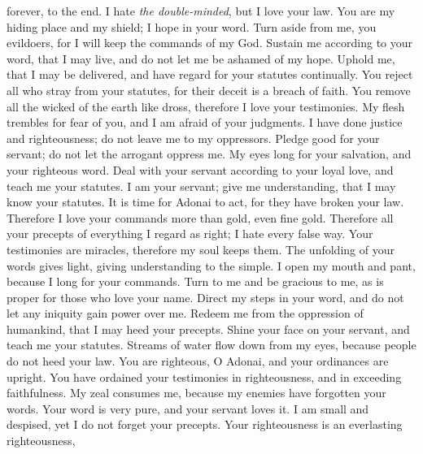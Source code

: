 \begin{biblechapter}
forever, to the end.
 I hate \textit{the double-minded}, 
but I love your law.
\verse You are my hiding place and my shield; 
I hope in your word.
\verse Turn aside from me, you evildoers, 
for I will keep the commands of my God.
\verse Sustain me according to your word, that I may live, 
and do not let me be ashamed of my hope.
\verse Uphold me, that I may be delivered, 
and have regard for your statutes continually.
\verse You reject all who stray from your statutes, 
for their deceit is a breach of faith.
\verse You remove all the wicked of the earth like dross, 
therefore I love your testimonies.
\verse My flesh trembles for fear of you, 
and I am afraid of your judgments.
 I have done justice and righteousness; 
do not leave me to my oppressors.
\verse Pledge good for your servant; 
do not let the arrogant oppress me.
\verse My eyes long for your salvation, 
and your righteous word.
\verse Deal with your servant according to your loyal love, 
and teach me your statutes.
\verse I am your servant; give me understanding, 
that I may know your statutes.
\verse It is time for Adonai to act, 
for they have broken your law.
\verse Therefore I love your commands 
more than gold, even fine gold.
\verse Therefore all your precepts of everything I regard as right; 
I hate every false way.
 Your testimonies are miracles, 
therefore my soul keeps them.
\verse The unfolding of your words gives light, 
giving understanding to the simple.
\verse I open my mouth and pant, 
because I long for your commands.
\verse Turn to me and be gracious to me, 
as is proper for those who love your name.
\verse Direct my steps in your word, 
and do not let any iniquity gain power over me.
\verse Redeem me from the oppression of humankind, 
that I may heed your precepts.
\verse Shine your face on your servant, 
and teach me your statutes.
\verse Streams of water flow down from my eyes, 
because people do not heed your law.
 You are righteous, O Adonai, 
and your ordinances are upright.
\verse You have ordained your testimonies in righteousness, 
and in exceeding faithfulness.
\verse My zeal consumes me, 
because my enemies have forgotten your words.
\verse Your word is very pure, 
and your servant loves it.
\verse I am small and despised, 
yet I do not forget your precepts.
\verse Your righteousness is an everlasting righteousness, 

\end{biblechapter}
